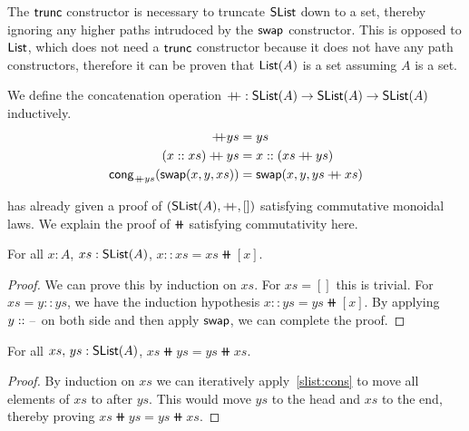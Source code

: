 The $\operatorname{\mathsf{trunc}}$ constructor is necessary to truncate $\operatorname{\mathsf{SList}}$ down to a set,
thereby ignoring any higher paths intrudoced by the $\operatorname{\mathsf{swap}}$ constructor.
This is opposed to $\operatorname{\mathsf{List}}$, which does not need a $\operatorname{\mathsf{trunc}}$ constructor
because it does not have any path constructors, therefore it can be proven that $\operatorname{\mathsf{List}}(A)$
is a set assuming $A$ is a set.

\begin{definition}[Concatenation]
    We define the concatenation operation $\mathbin{+\kern -0.4em+} : \operatorname{\mathsf{SList}}(A) \to \operatorname{\mathsf{SList}}(A) \to \operatorname{\mathsf{SList}}(A)$
    inductively.
    \begin{align*}
        [] \doubleplus ys & = ys \\
        (x :: xs) \doubleplus ys & = x :: (xs \doubleplus ys) \\
        \term{cong}_{\doubleplus ys}(\term{swap}(x, y, xs)) & = \term{swap}(x, y, ys \doubleplus xs)
    \end{align*}
\end{definition}

\cite{choudhuryFreeCommutativeMonoids2023} has already given a proof of $(\operatorname{\mathsf{SList}}(A), \mathbin{+\kern -0.4em+}, [])$
satisfying commutative monoidal laws. We explain the proof of $\doubleplus$ satisfying commutativity here.

\begin{lemma}\label{slist:cons}
    For all $x : A$, $xs : \operatorname{\mathsf{SList}}(A)$, $x :: xs = xs \doubleplus [ x ]$.
\end{lemma}

\begin{proof}
We can prove this by induction on $xs$.
For $xs = []$ this is trivial. For $xs = y :: ys$, we have the induction hypothesis $x :: ys = ys \doubleplus [ x ]$.
By applying $y :: {\scriptstyle{-}}$ on both side and then apply $\operatorname{\mathsf{swap}}$, we can complete the proof.
\end{proof}

\begin{theorem}[Commutativity]\label{slist:comm}
    For all $xs,\,ys : \operatorname{\mathsf{SList}}(A)$, $xs \doubleplus ys = ys \doubleplus xs$.
\end{theorem}

\begin{proof}
    By induction on $xs$ we can iteratively apply~\cref{slist:cons} to move all elements of $xs$
    to after $ys$. This would move $ys$ to the head and $xs$ to the end, thereby proving
    $xs \doubleplus ys = ys \doubleplus xs$.
\end{proof}

